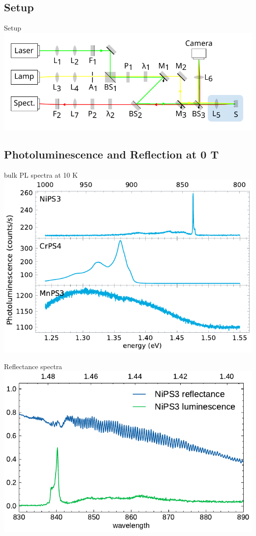 \subsection{Setup}
\begin{frame}{Setup}
	\centering
	\includegraphics{../figures/setup.pdf}
\end{frame}


\subsection{Photoluminescence and Reflection at 0 T}
\begin{frame}{bulk PL spectra at 10 K}
	\centering
	\includegraphics{../figures/2023-12-10 Combined PL.pdf}
\end{frame}

\begin{frame}{Reflectance spectra}
	\centering
	\includegraphics{../figures/2023-12-10 reflectance.pdf}
\end{frame}

